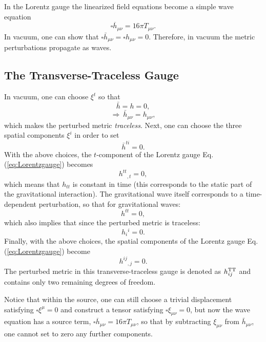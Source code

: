 \documentclass[12pt]{article}
\begin{document}
In the Lorentz gauge the linearized field equations become a simple wave equation
\begin{equation}
\square {\overline h}_{\mu\nu}=16\pi T_{\mu\nu}.
\end{equation}
In vacuum, one can show that $\square \bar h_{\mu\nu} = \square h_{\mu\nu} = 0$. Therefore, in vacuum the metric perturbations propagate as waves.

\subsection{The Transverse-Traceless Gauge}

In vacuum, one can choose $\xi^t$ so that
\begin{equation}
\boxed{\bar h =h=0},
\end{equation}
\begin{equation}
\Rightarrow \  \bar h_{\mu\nu} =h_{\mu\nu},
\end{equation}
which makes the perturbed metric \emph{traceless}. Next, one can choose the three spatial components $\xi^i$ in order to set
\begin{equation}
 \boxed{ \bar h^{ti} =0}.
\end{equation}
With the above choices, the $t$-component of the Lorentz gauge Eq. (\ref{eq:Lorentzgauge}) becomes
\begin{equation}
h^{tt}{}_{,t}=0,
\end{equation}
which means that $h_{tt}$ is constant in time (this corresponds to the static part of the gravitational interaction).
The gravitational wave itself corresponds to a time-dependent perturbation, so that for gravitational waves: 
\begin{equation}
\boxed{h^{tt}=0},
\end{equation}
which also implies that since the perturbed metric is traceless: 
\begin{equation}
\boxed{ h_i{}^i=0}.
\end{equation}
Finally, with the above choices, the spatial components of the Lorentz gauge  Eq. (\ref{eq:Lorentzgauge}) become\begin{equation}
\boxed{h^{i j}{}_{,j}=0}.
\end{equation}
The perturbed metric in this transverse-traceless gauge is denoted as $h_{ij}^{\rm TT}$ and contains only two remaining degrees of freedom. 

Notice that within the source, one can still choose a trivial displacement satisfying $\square \xi^{\mu}=0$ and construct a tensor satisfying
 $\square \xi_{\mu \nu}=0$, but now the wave equation has a source term, $\square {\overline h}_{\mu\nu}=16\pi T_{\mu\nu}$, so that by subtracting $\xi_{\mu\nu}$ from $\bar h_{\mu\nu}$, one cannot set to zero any further components.
\end{document}
